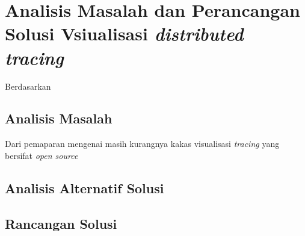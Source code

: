 \chapter{Analisis Masalah dan Perancangan Solusi Vsiualisasi \textit{distributed tracing}}

Berdasarkan 


\section{Analisis Masalah}

Dari pemaparan mengenai masih kurangnya kakas visualisasi \textit{tracing} yang bersifat \textit{open source}



\section{Analisis Alternatif Solusi}

\section{Rancangan Solusi}


